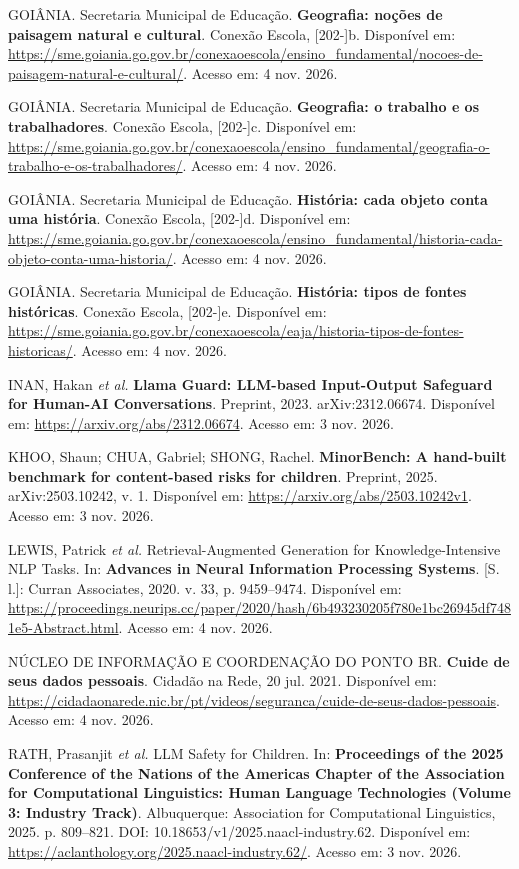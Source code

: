 GOIÂNIA. Secretaria Municipal de Educação. \textbf{Geografia: noções de paisagem natural e cultural}. Conexão Escola, [202-]b. Disponível em: \url{https://sme.goiania.go.gov.br/conexaoescola/ensino_fundamental/nocoes-de-paisagem-natural-e-cultural/}. Acesso em: 4 nov. 2026.

GOIÂNIA. Secretaria Municipal de Educação. \textbf{Geografia: o trabalho e os trabalhadores}. Conexão Escola, [202-]c. Disponível em: \url{https://sme.goiania.go.gov.br/conexaoescola/ensino_fundamental/geografia-o-trabalho-e-os-trabalhadores/}. Acesso em: 4 nov. 2026.

GOIÂNIA. Secretaria Municipal de Educação. \textbf{História: cada objeto conta uma história}. Conexão Escola, [202-]d. Disponível em: \url{https://sme.goiania.go.gov.br/conexaoescola/ensino_fundamental/historia-cada-objeto-conta-uma-historia/}. Acesso em: 4 nov. 2026.

GOIÂNIA. Secretaria Municipal de Educação. \textbf{História: tipos de fontes históricas}. Conexão Escola, [202-]e. Disponível em: \url{https://sme.goiania.go.gov.br/conexaoescola/eaja/historia-tipos-de-fontes-historicas/}. Acesso em: 4 nov. 2026.

INAN, Hakan \textit{et al.} \textbf{Llama Guard: LLM-based Input-Output Safeguard for Human-AI Conversations}. Preprint, 2023. arXiv:2312.06674. Disponível em: \url{https://arxiv.org/abs/2312.06674}. Acesso em: 3 nov. 2026.

KHOO, Shaun; CHUA, Gabriel; SHONG, Rachel. \textbf{MinorBench: A hand-built benchmark for content-based risks for children}. Preprint, 2025. arXiv:2503.10242, v. 1. Disponível em: \url{https://arxiv.org/abs/2503.10242v1}. Acesso em: 3 nov. 2026.

LEWIS, Patrick \textit{et al.} Retrieval-Augmented Generation for Knowledge-Intensive NLP Tasks. In: \textbf{Advances in Neural Information Processing Systems}. [S. l.]: Curran Associates, 2020. v. 33, p. 9459--9474. Disponível em: \url{https://proceedings.neurips.cc/paper/2020/hash/6b493230205f780e1bc26945df7481e5-Abstract.html}. Acesso em: 4 nov. 2026.

NÚCLEO DE INFORMAÇÃO E COORDENAÇÃO DO PONTO BR. \textbf{Cuide de seus dados pessoais}. Cidadão na Rede, 20 jul. 2021. Disponível em: \url{https://cidadaonarede.nic.br/pt/videos/seguranca/cuide-de-seus-dados-pessoais}. Acesso em: 4 nov. 2026.

RATH, Prasanjit \textit{et al.} LLM Safety for Children. In: \textbf{Proceedings of the 2025 Conference of the Nations of the Americas Chapter of the Association for Computational Linguistics: Human Language Technologies (Volume 3: Industry Track)}. Albuquerque: Association for Computational Linguistics, 2025. p. 809--821. DOI: 10.18653/v1/2025.naacl-industry.62. Disponível em: \url{https://aclanthology.org/2025.naacl-industry.62/}. Acesso em: 3 nov. 2026.

